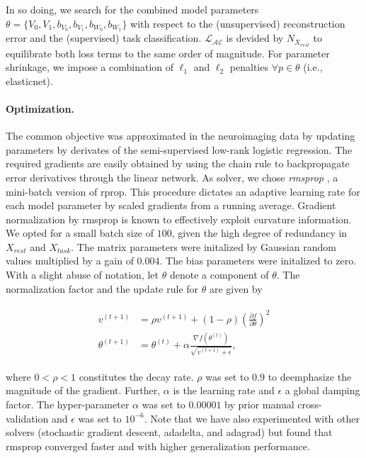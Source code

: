 \documentclass{article} %
\begin{document}
In so doing, we search for the combined model parameters
$\theta=\{V_0,V_1,b_{V_0}, b_{V_1}, b_{W_0}, b_{W_1}\}$
with respect to the (unsupervised) reconstruction error and the
(supervised) task classification.
${\mathcal{L_{AE}}}$ is devided by ${N_{X_{rest}}}$ to equilibrate both
loss terms to the same order of magnitude.
For parameter shrinkage, we
impose a combination of $\ell_1$ and $\ell_2$ penalties
$\forall p \in \theta$ (i.e., elasticnet).

\paragraph{Optimization.}
The common objective was approximated in the neuroimaging data
by updating parameters by derivates of the 
semi-supervised low-rank logistic regression.
The required gradients are easily obtained by using the chain rule to
backpropagate error derivatives through the linear network.
As solver, we chose \textit{rmsprop} \cite{rmsprop},
a mini-batch version of rprop.
This procedure dictates an adaptive learning rate
for each model parameter by
scaled gradients from a running average.
Gradient normalization by rmsprop
is known to effectively exploit curvature information.
We opted for a small batch size of $100$, given the high degree of
redundancy in $X_{rest}$ and $X_{task}$.
The matrix parameters were initalized by Gaussian random values multiplied
by a gain of $0.004$. The bias parameters were initalized to zero.
With a slight abuse of notation, let $\theta$ denote a component of $\theta$.
The normalization factor and the update rule for $\theta$
are given by

\begin{eqnarray}
  \begin{split}
v^{(t+1)} &= \rho v^{(t+1)} + (1 - \rho)\left(\frac{\partial f}{\partial \theta}\right)^2
\\
\theta^{(t+1)} &= \theta^{(t)} + \alpha \frac{\nabla f(\theta^{(t)})}{\sqrt{v^{(t+1)} + \epsilon}},
  \end{split}
\end{eqnarray}

where $0 < \rho < 1$ constitutes the decay rate. $\rho$ was set to
$0.9$ to deemphasize the magnitude of the gradient.
Further, $\alpha$ is the learning rate and $\epsilon$ a global damping factor.
The hyper-parameter $\alpha$ was set to $0.00001$ by prior manual
cross-validation and $\epsilon$ was set to $10^{-6}$.
%
Note that we have also experimented with other solvers
(stochastic gradient descent, adadelta, and adagrad) but found that
rmsprop converged faster and with higher generalization performance.
\end{document}
